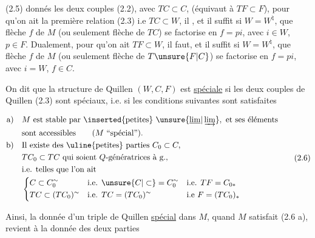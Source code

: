 
(2.5)  donnés les deux couples (2.2), avec $TC\subset C$,
 (équivaut à $TF\subset F$), pour qu'on ait
la première relation (2.3) i.e $TC\subset W$, il 
, et il suffit si $W=W^{\natural}$, que  flèche $f$
de $M$ (ou seulement  flèche de $TC$) se
factorise en $f=pi$, avec $i\in W$, $p\in F$. Dualement,
pour qu'on ait $TF\subset W$, il faut, et il
suffit si $W=W^{\natural}$, que  flèche $f$ de $M$
(ou seulement  flèche de $T\unsure{F|C}$) se factorise
en $f=pi$, avec $i=W$, $f\in C$.


On dit que la structure de Quillen $(W,C,F)$
est \uline{spéciale} si les deux couples de Quillen
(2.3) sont spéciaux, i.e. si les conditions
suivantes sont satisfaites

\[
\begin{aligned}
\text{a)}\quad &M\ \text{est stable par \inserted{petites} }\unsure{\underline{\lim}|\varinjlim},\ \text{et ses éléments}\\
&\text{sont accessibles}\qquad(M\text{ ``spécial''}).\\
\text{b)}\quad &\text{Il existe des \uline{petites} parties }C_0\subset C,\\
&TC_0\subset TC\ \text{qui soient } Q\text{-génératrices à g.,}\\
&\text{i.e. telles que l'on ait}\\[-1pt]
&\left\{\begin{aligned}
&C\subset C_0^{\sim} &&\text{i.e. } \unsure{C|\subset}=C_0^{\sim} &&\text{i.e. } TF=C_{0*}\\
&TC\subset(TC_0)^{\sim} &&\text{i.e. } TC=(TC_0)^{\sim} &&\text{i.e } F=(TC_0)_*
\end{aligned}\right.
\end{aligned}\tag*{(2.6)}
\]

Ainsi, la donnée d'un triple de Quillen
\uline{spécial} dans $M$,  quand $M$ satisfait (2.6 a),
revient à la donnée des deux parties 
